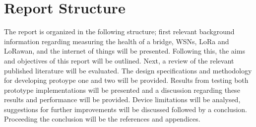 \section{Report Structure}

The report is organized in the following structure; first relevant background information regarding measuring the health of a bridge, WSNs, LoRa and LoRawan, and the internet of things will be presented. Following this, the aims and objectives of this report will be outlined. Next, a review of the relevant published literature will be evaluated. The design specifications and methodology for developing protoype one and two will be provided. Results from testing both prototype implementations will be presented and a discussion regarding these results and performance will be provided. Device limitations will be analysed, suggestions for further improvements will be discussed followed by a conclusion. Proceeding the conclusion will be the references and appendices. 